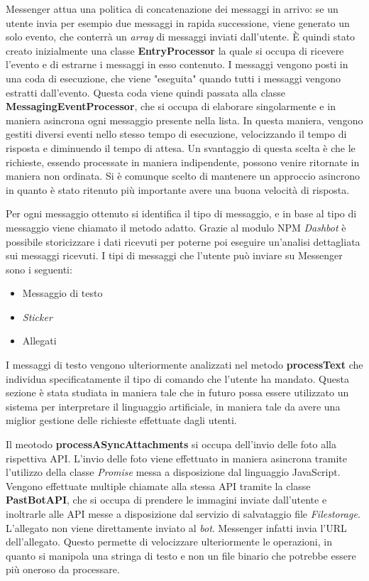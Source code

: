 Messenger attua una politica di concatenazione dei messaggi in arrivo: se un
utente invia per esempio due messaggi in rapida successione, viene generato un
solo evento, che conterrà un \textit{array} di messaggi inviati dall'utente. È
quindi stato creato inizialmente una classe \textbf{EntryProcessor} la quale si
occupa di ricevere l'evento e di estrarne i messaggi in esso contenuto. I
messaggi vengono posti in una coda di esecuzione, che viene "eseguita" quando
tutti i messaggi vengono estratti dall'evento.
Questa coda viene quindi passata alla classe \textbf{MessagingEventProcessor},
che si occupa di elaborare singolarmente e in maniera asincrona ogni messaggio
presente nella lista. In questa maniera, vengono gestiti diversi eventi nello
stesso tempo di esecuzione, velocizzando il tempo di risposta e diminuendo il
tempo di attesa. Un svantaggio di questa scelta è che le richieste,
essendo processate in maniera indipendente, possono venire ritornate in maniera
non ordinata. Si è comunque scelto di mantenere un approccio asincrono in
quanto è stato ritenuto più importante avere una buona velocità di risposta.

Per ogni messaggio ottenuto si identifica il tipo di messaggio, e in base al
tipo di messaggio viene chiamato il metodo adatto. Grazie al modulo NPM
\textit{Dashbot} è possibile storicizzare i dati ricevuti per poterne poi
eseguire un'analisi dettagliata sui messaggi ricevuti.
I tipi di messaggi che l'utente può inviare su Messenger sono i seguenti:
\begin{itemize}
  \item Messaggio di testo
  \item \textit{Sticker}
  \item Allegati
\end{itemize}
I messaggi di testo vengono ulteriormente analizzati nel metodo
\textbf{processText} che individua specificatamente il tipo di comando che
l'utente ha mandato. Questa sezione è stata studiata in maniera tale che in
futuro possa essere utilizzato un sistema per interpretare il linguaggio
artificiale, in maniera tale da avere una miglior gestione delle richieste
effettuate dagli utenti.

Il meotodo \textbf{processASyncAttachments} si occupa dell'invio delle foto
alla rispettiva API. L'invio delle foto viene effettuato in maniera asincrona
tramite l'utilizzo della classe \textit{Promise} messa a disposizione dal
linguaggio JavaScript. Vengono effettuate multiple chiamate alla stessa API
tramite la classe \textbf{PastBotAPI}, che si occupa di prendere le immagini
inviate dall'utente e inoltrarle alle API messe a disposizione dal servizio di
salvataggio file \textit{Filestorage}.
L'allegato non viene direttamente inviato al \textit{bot}. Messenger infatti
invia l'URL dell'allegato. Questo permette di velocizzare ulteriormente le
operazioni, in quanto si manipola una stringa di testo e non un file binario
che potrebbe essere più oneroso da processare.

